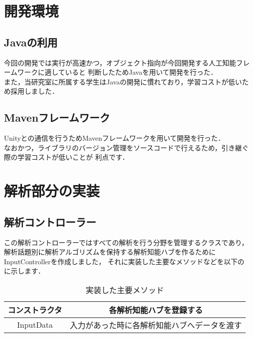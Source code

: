 
\section{開発環境}
\subsection{Javaの利用}
今回の開発では実行が高速かつ，オブジェクト指向が今回開発する人工知能フレームワークに適していると
判断したためJavaを用いて開発を行った．\\
また，当研究室に所属する学生はJavaの開発に慣れており，学習コストが低いため採用しました．\\

\subsection{Mavenフレームワーク}
Unityとの通信を行うためMavenフレームワークを用いて開発を行った．\\
なおかつ，ライブラリのバージョン管理をソースコードで行えるため，引き継ぐ際の学習コストが低いことが
利点です．\\

\section{解析部分の実装}
\subsection{解析コントローラー}
この解析コントローラーではすべての解析を行う分野を管理するクラスであり，
解析話題別に解析アルゴリズムを保持する解析知能ハブを作るためにInputControllerを作成しました，
それに実装した主要なメソッドなどを以下のに示します．\\

\begin{table}[tbh]
	\caption{実装した主要メソッド} \label{tab:InputController}
	\begin{center}
		\begin{tabular}[htb]{c|c}
		\hline
		コンストラクタ & 各解析知能ハブを登録する \\
		\hline
		InputData & 入力があった時に各解析知能ハブへデータを渡す \\
		\hline
		\end{tabular}
	\end{center}
\end{table}


